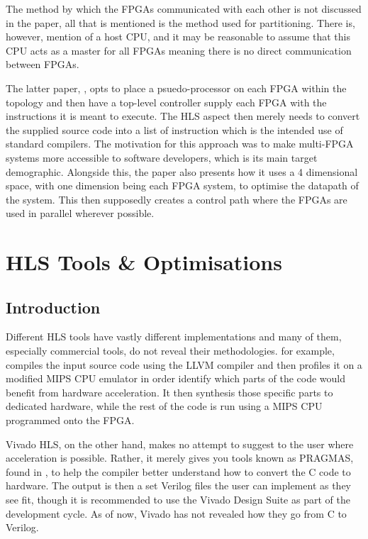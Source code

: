 The method by which the FPGAs communicated with each other is not discussed in the paper, all that is mentioned is the method used for partitioning. There is, however, mention of a host CPU, and it may be reasonable to assume that this CPU acts as a master for all FPGAs meaning there is no direct communication between FPGAs.

The latter paper, \cite{707888}, opts to place a psuedo-processor on each FPGA within the topology and then have a top-level controller supply each FPGA with the instructions it is meant to execute. The HLS aspect then merely needs to convert the supplied source code into a list of instruction which is the intended use of standard compilers. The motivation for this approach was to make multi-FPGA systems more accessible to software developers, which is its main target demographic. Alongside this, the paper also presents how it uses a 4 dimensional space, with one dimension being each FPGA system, to optimise the datapath of the system. This then supposedly creates a control path where the FPGAs are used in parallel wherever possible.

\section{HLS Tools \& Optimisations}

\subsection{Introduction}

Different HLS tools have vastly different implementations \cite{7368920} and many of them, especially commercial tools, do not reveal their methodologies. \cite{legup} for example, compiles the input source code using the LLVM compiler and then profiles it on a modified MIPS CPU emulator in order identify which parts of the code would benefit from hardware acceleration. It then synthesis those specific parts to dedicated hardware, while the rest of the code is run using a MIPS CPU programmed onto the FPGA.

Vivado HLS, on the other hand, makes no attempt to suggest to the user where acceleration is possible. Rather, it merely gives you tools known as PRAGMAS, found in \cite{vivado-optmisation-manual}, to help the compiler better understand how to convert the C code to hardware. The output is then a set Verilog files the user can implement as they see fit, though it is recommended to use the Vivado Design Suite \cite{vivado-design-suite-manual} as part of the development cycle. As of now, Vivado has not revealed how they go from C to Verilog.

